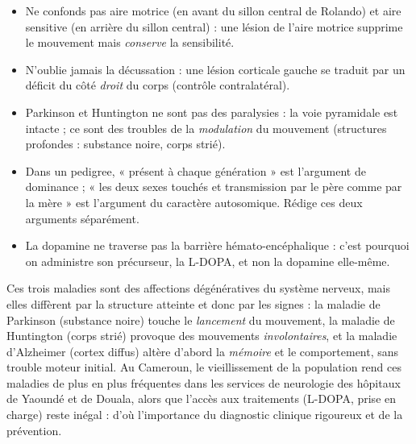 \documentclass[11pt]{article}
\newcommand{\cle}[1]{{\popxbold\color{popdark}#1}}
\newcounter{popsec}
\newcounter{popsub}
\newcommand{\courssub}[1]{%
  \stepcounter{popsub}%
  \par\vspace{9pt}\noindent{\popxbold\fontsize{11.5}{13}\selectfont\color{popink}{\color{poporange}\thepopsec.\thepopsub}\hspace{6pt}#1}\par\nopagebreak\vspace{4pt}
}
\begin{document}
\begin{attention}
\begin{itemize}
\item Ne confonds pas \cle{aire motrice} (en avant du sillon central de Rolando) et \cle{aire sensitive} (en arrière du sillon central) : une lésion de l'aire motrice supprime le mouvement mais \emph{conserve} la sensibilité.
\item N'oublie jamais la \cle{décussation} : une lésion corticale gauche se traduit par un déficit du côté \emph{droit} du corps (contrôle contralatéral).
\item Parkinson et Huntington ne sont pas des paralysies : la voie pyramidale est intacte ; ce sont des troubles de la \emph{modulation} du mouvement (structures profondes : substance noire, corps strié).
\item Dans un pedigree, « présent à chaque génération » est l'argument de dominance ; « les deux sexes touchés et transmission par le père comme par la mère » est l'argument du caractère autosomique. Rédige ces deux arguments séparément.
\item La dopamine ne traverse pas la barrière hémato-encéphalique : c'est pourquoi on administre son précurseur, la L-DOPA, et non la dopamine elle-même.
\end{itemize}
\end{attention}

\begin{savaistu}
Ces trois maladies sont des affections dégénératives du système nerveux, mais elles diffèrent par la structure atteinte et donc par les signes : la maladie de Parkinson (substance noire) touche le \emph{lancement} du mouvement, la maladie de Huntington (corps strié) provoque des mouvements \emph{involontaires}, et la maladie d'Alzheimer (cortex diffus) altère d'abord la \emph{mémoire} et le comportement, sans trouble moteur initial. Au Cameroun, le vieillissement de la population rend ces maladies de plus en plus fréquentes dans les services de neurologie des hôpitaux de Yaoundé et de Douala, alors que l'accès aux traitements (L-DOPA, prise en charge) reste inégal : d'où l'importance du diagnostic clinique rigoureux et de la prévention.
\end{savaistu}

\courssub{Bilan de l'activité}
\end{document}
